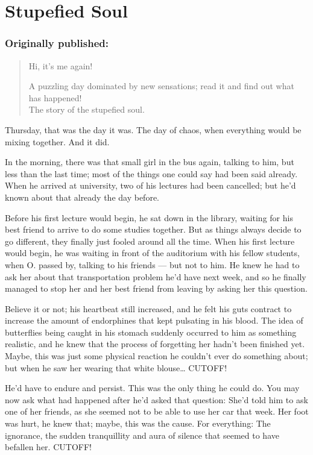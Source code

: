 \chapter{Stupefied Soul}
\label{cha:stupefied-soul}
\subsection*{Originally published: }
\begin{quote}
Hi, it's me again!

A puzzling day dominated by new sensations; read it and find out what has happened!\\
The story of the stupefied soul. 
\end{quote}

Thursday, that was the day it was. The day of chaos, when everything would be mixing together. 
And it did.

In the morning, there was that small girl in the bus again, talking to him, but less than the last time; most of the things one could say had been said already. 
When he arrived at university, two of his lectures had been cancelled; but he'd known about that already the day before.

Before his first lecture would begin, he sat down in the library, waiting for his best friend to arrive to do some studies together. But as things always decide to go different, they finally just fooled around all the time. When his first lecture would begin, he was waiting in front of the auditorium with his fellow students, when O. passed by, talking to his friends --- but not to him. He knew he had to ask her about that transportation problem he'd have next week, and so he finally managed to stop her and her best friend from leaving by asking her this question.

Believe it or not; his heartbeat still increased, and he felt his guts contract to increase the amount of endorphines that kept pulsating in his blood. The idea of butterflies being caught in his stomach suddenly occurred to him as something realistic, and he knew that the process of forgetting her hadn't been finished yet. Maybe, this was just some physical reaction he couldn't ever do something about; but when he saw her wearing that white blouse\dots{}
CUTOFF!

He'd have to endure and persist. 
This was the only thing he could do. 
You may now ask what had happened after he'd asked that question: She'd told him to ask one of her friends, as she seemed not to be able to use her car that week. Her foot was hurt, he knew that; maybe, this was the cause. 
For everything: The ignorance, the sudden tranquillity and aura of silence that seemed to have befallen her. 
CUTOFF!

